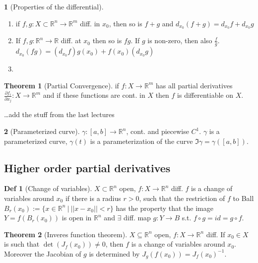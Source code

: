 \documentclass[a4paper, 10pt]{article}
\theoremstyle{definition}
\newtheorem*{definition}{Def}
\theoremstyle{colored}
\newtheorem*{note_wrapper}{}
\theoremstyle{ex}
\theoremstyle{named}
\newtheorem*{ntheorem_wrapper}{Theorem}
\newenvironment{ntheorem}%
    {\begin{mdframed}[style=important]\begin{ntheorem_wrapper}}%
    {\end{ntheorem_wrapper}\end{mdframed}}
\newenvironment{note}%
    {\begin{mdframed}[style=trick]\begin{note_wrapper}}%
    {\end{note_wrapper}\end{mdframed}}
\newcommand{\R}{\mathbb{R}}
\begin{document}
\begin{note}[Properties of the differential]
    \begin{enumerate}
        \item if \(f, g: X \subset \R^n \to \R^m\) diff. in \(x_0\), then so is \(f + g\) and \(d_{x_0}(f + g) = d_{x_0}f + d_{x_0}g\)
        \item If \(f, g: \R^n \to \R\) diff. at \(x_0\) then so is \(fg\). If \(g\) is non-zero, then also \(\frac{f}{g}\). \(d_{x_0}(fg) = (d_{x_0}f)g(x_0) + f(x_0)(d_{x_0}g)\)
        \item 
    \end{enumerate}
\end{note}

\begin{ntheorem}[Partial Convergence]
    if \(f : X \to \R^m\) has all partial derivatives \(\frac{\partial f_i}{\partial x_j}: X \to \R^m\) and if these functions are cont. in \(X\) then \(f\) is differentiable on \(X\).
\end{ntheorem}

\ldots add the stuff from the last lectures

\begin{note}[Parameterized curve]
    \(\gamma: [a, b] \to \R^n\), cont. and piecewise \(C^1\). \(\gamma\) is a parameterized curve, \(\gamma(t)\) is a parameterization of the curve \(\Im \gamma = \gamma([a, b])\).
\end{note}

\subsection*{Higher order partial derivatives}
\begin{definition}[Change of variables]
    \(X \subset \R^n\) open, \(f: X \to \R^n\) diff. \(f\) is a change of variables around \(x_0\) if there is a radius \(r > 0\), such that the restriction of \(f\) to Ball \(B_r(x_0) := \{x \in \R^n \ | \ ||x - x_0|| < r\}\) has the property that the image \(Y = f(B_r(x_0))\) is open in \(\R^n\) and \(\exists\) diff. map \(g: Y \to B\) s.t. \(f \circ g = id = g \circ f\).
\end{definition}

\begin{ntheorem}[Inveres function theorem]
    \(X \subseteq \R^n\) open, \(f: X \to \R^n\) diff. If \(x_0 \in X\) is such that \(\det(J_f(x_0)) \neq 0\), then \(f\) is a change of variables around \(x_0\). Moreover the Jacobian of \(g\) is determined by \(J_g(f(x_0)) = J_f(x_0)^{-1}\).
\end{ntheorem}
\end{document}
